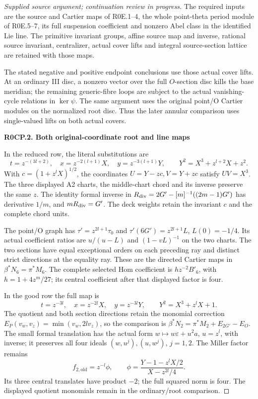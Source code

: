 \begin{proof}[Supplied source argument; continuation review in progress]
The required inputs are the source and Cartier maps of R0E.1--4,
the whole point-theta period module of R0E.5--7, its full suspension
coefficient and nonzero Abel class in the identified Lie line. The
primitive invariant groups, affine source map and inverse, rational
source invariant, centralizer, actual cover lifts and integral
source-section lattice are retained with those maps.

The stated negative and positive endpoint conclusions use those actual
cover lifts. At an ordinary III disc, a nonzero vector over the full
\(O\)-section disc kills the base meridian; the remaining generic-fibre
loops are subject to the actual vanishing-cycle relations in
\(\ker\psi\). The same argument uses the original point/O Cartier
modules on the normalized root disc. Thus the later annular comparison
uses single-valued lifts on both actual covers.

\par

\medskip\noindent\textbf{R0CP.2. Both original-coordinate root and line maps}

\par\nobreak

In the reduced row, the literal substitutions are
\[
 t=z^{-(3l+2)},\quad x=z^{-2(l+1)}X,\quad y=z^{-3(l+1)}Y,
 \qquad Y^2=X^3+z^{l+2}X+z^2.
\]
With \(c=(1+z^lX)^{1/2}\), the coordinates
\(U=Y-zc,V=Y+zc\) satisfy \(UV=X^3\). The three displayed A2
charts, the middle-chart chord and its inverse preserve the same
\(z\). The identity formal inverse in
\(R_{\rm div}=2G'-[m]^{-1}((2m-1)G')\) has derivative \(1/m\),
and \(mR_{\rm div}=G'\). The deck weights retain the invariant
\(c\) and the complete chord units.

The point/O graph has \(\tau'=z^{2l+1}\tau_0\) and
\(\tau'(6G')=z^{2l+1}L\), \(L(0)=-1/4\). Its actual coefficient
ratios are \(u/(u-L)\) and \((1-vL)^{-1}\) on the two charts.
The two sections have equal exceptional orders on each preceding
ray and distinct strict directions at the equality ray. These
are the directed Cartier maps in
\(\beta^*N_6=\pi^*M_6\). The complete selected Hom coefficient is
\(h z^{-2}B'_6\), with \(h=1+4z^m/27\); its central coefficient
after that displayed factor is four.

In the good row the full map is
\[
 t=z^{-3l},\quad x=z^{-2l}X,\quad y=z^{-3l}Y,
 \qquad Y^2=X^3+z^lX+1.
\]
The quotient and both section directions retain the monomial
correction
\(E_P(v_w,v_z)=\min(v_w,2l v_z)\), so the comparison is
\(\beta^*N_2=\pi^*M_2+E_{2G'}-E_O\).
The small formal translation has the actual form
\(w\mapsto w\varepsilon+u^2a\), \(u=z^l\), with inverse;
it preserves all four ideals \((w,u^j),(u,w^j)\), \(j=1,2\).
The Miller factor remains
\[
 f_{2,\mathrm{old}}=z^{-l}\phi,\qquad
 \phi=\frac{Y-1-z^lX/2}{X-z^{2l}/4}.
\]
Its three central translates have product \(-2\); the full squared
norm is four. The displayed quotient monomials remain in the
ordinary/root comparison.


\end{proof}
